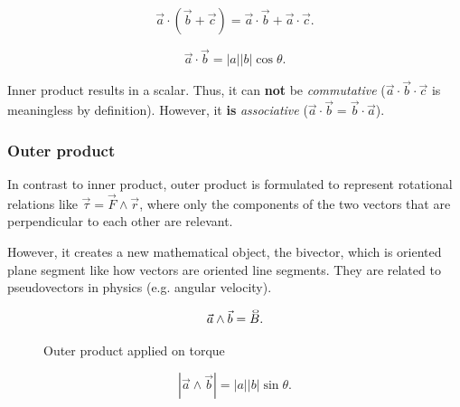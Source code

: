\[
    \vec{a} \cdot ( \vec{b} + \vec{c} ) = \vec{a}\cdot\vec{b} + \vec{a}\cdot\vec{c}
.\]

\begin{definition}
    \[
        \vec{a} \cdot \vec{b} = |a| |b| \cos\theta
    .\]
\end{definition}

\begin{note}
    Inner product results in a scalar. Thus, it can \textbf{not} be \textit{commutative} ($\vec{a}\cdot \vec{b}\cdot \vec{c}$ is meaningless by definition). However, it \textbf{is} \textit{associative} ($\vec{a}\cdot \vec{b}=\vec{b}\cdot \vec{a}$).
\end{note}

\subsubsection{Outer product}%
\label{ssub:vector-outer-product}

In contrast to inner product, outer product is formulated to represent rotational relations like $\vec{\tau} = \vec{F} \wedge \vec{r}$, where only the components of the two vectors that are perpendicular to each other are relevant.

However, it creates a new mathematical object, the bivector, which is oriented plane segment like how vectors are oriented line segments. They are related to pseudovectors in physics (e.g. angular velocity).

\[
    \vec{a}\wedge \vec{b}=\bivec{B}
.\]

\begin{figure}[htpb]
\begin{center}
\end{center}
\caption{Outer product applied on torque}%
\label{fig:torque-outer-product}
\end{figure}

\begin{definition}
    \[
        |\vec{a} \wedge \vec{b}| = |a| |b| \sin\theta
    .\]
\end{definition}

